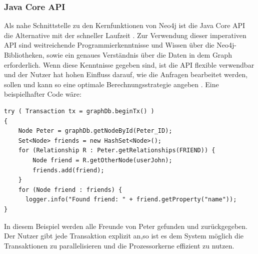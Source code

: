\subsubsection{Java Core API}
Als nahe Schnittstelle zu den Kernfunktionen von Neo4j ist die Java Core API die Alternative mit der schneller Laufzeit \parencite{vukotic2015neo4j}. Zur Verwendung dieser imperativen API sind weitreichende Programmierkenntnisse und Wissen über die Neo4j-Bibliotheken, sowie ein genaues Verständnis  über die Daten in dem Graph erforderlich. Wenn diese Kenntnisse gegeben sind, ist die API flexible verwendbar  und der Nutzer hat hohen Einfluss darauf, wie die Anfragen bearbeitet werden, sollen und kann so eine optimale Berechnungsstrategie angeben \parencite{vukotic2015neo4j}. Eine beispielhafter Code wäre: \newline
\begin{Verbatim}[frame=single]
try ( Transaction tx = graphDb.beginTx() )
{
	Node Peter = graphDb.getNodeById(Peter_ID);
	Set<Node> friends = new HashSet<Node>();
	for (Relationship R : Peter.getRelationships(FRIEND)) {  
		Node friend = R.getOtherNode(userJohn);
		friends.add(friend);                        
	}
	for (Node friend : friends) {
	  logger.info("Found friend: " + friend.getProperty("name")); 
}

\end{Verbatim}
In diesem Beispiel werden alle Freunde von Peter gefunden und zurückgegeben. Der Nutzer gibt jede Transaktion explizit an,so ist es dem System möglich die Transaktionen zu parallelisieren und die Prozessorkerne effizient zu nutzen.

